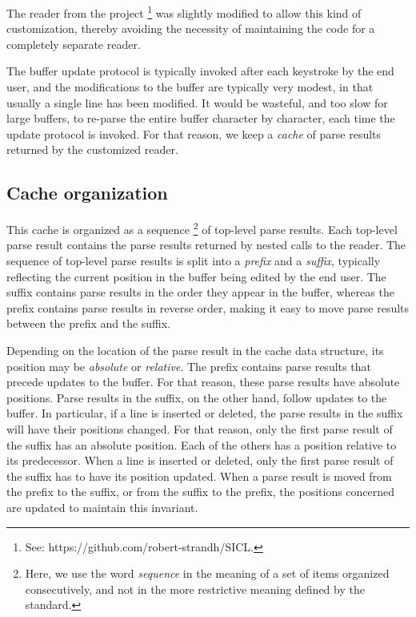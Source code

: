 The reader from the \sicl{} project%
\footnote{See: https://github.com/robert-strandh/SICL.}  was slightly
modified to allow this kind of customization, thereby avoiding the
necessity of maintaining the code for a completely separate reader.

The buffer update protocol is typically invoked after each keystroke
by the end user, and the modifications to the buffer are typically
very modest, in that usually a single line has been modified.  It
would be wasteful, and too slow for large buffers, to re-parse the
entire buffer character by character, each time the update protocol is
invoked.  For that reason, we keep a \emph{cache} of parse results
returned by the customized reader.

\subsection{Cache organization}

This cache is organized as a sequence%
\footnote{Here, we use the word \emph{sequence} in the meaning of a
  set of items organized consecutively, and not in the more
  restrictive meaning defined by the \commonlisp{} standard.}  of
top-level parse results.  Each top-level parse result contains the
parse results returned by nested calls to the reader.  The sequence of
top-level parse results is split into a \emph{prefix} and a
\emph{suffix}, typically reflecting the current position in the buffer
being edited by the end user.  The suffix contains parse results in
the order they appear in the buffer, whereas the prefix contains parse
results in reverse order, making it easy to move parse results between
the prefix and the suffix.

Depending on the location of the parse result in the cache data
structure, its position may be \emph{absolute} or \emph{relative}.
The prefix contains parse results that precede updates to the buffer.
For that reason, these parse results have absolute positions.  Parse
results in the suffix, on the other hand, follow updates to the
buffer.  In particular, if a line is inserted or deleted, the parse
results in the suffix will have their positions changed.  For that
reason, only the first parse result of the suffix has an absolute
position.  Each of the others has a position relative to its
predecessor.  When a line is inserted or deleted, only the first parse
result of the suffix has to have its position updated.  When a parse
result is moved from the prefix to the suffix, or from the suffix to
the prefix, the positions concerned are updated to maintain this
invariant.

